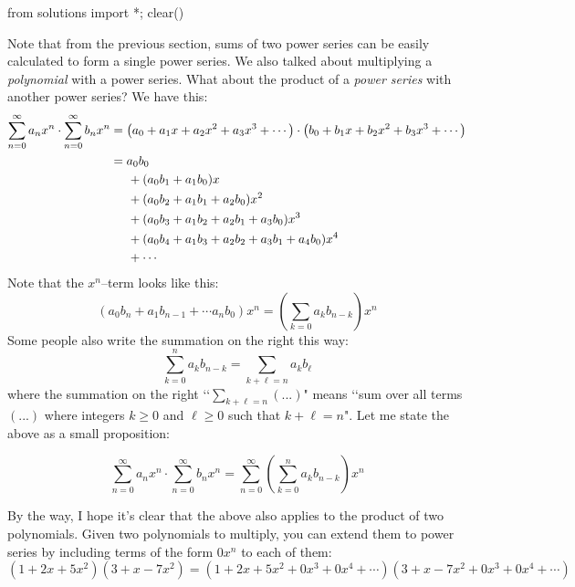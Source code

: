 \begin{python0}
from solutions import *; clear() 
\end{python0}

Note that from the previous section, sums of two power series
can be easily calculated to form a single power series.
We also talked about multiplying a \textit{polynomial} with a power series.
What about the product of a \textit{power series} with another power series?
We have this:
\begin{align*}
  \sum_{n=0}^\infty a_n x^n \cdot \sum_{n=0}^\infty b_n x^n
  &= \left(a_0 + a_1x + a_2x^2 + a_3x^3 + \cdots \right) \cdot
  \left(b_0 + b_1x + b_2x^2 + b_3x^3 + \cdots \right)
  \\
  &= a_0 b_0 \\
  &\hskip 0.5cm + (a_0 b_1 + a_1 b_0) x \\ 
  &\hskip 0.5cm + (a_0 b_2 + a_1 b_1 + a_2 b_0) x^2 \\ 
  &\hskip 0.5cm + (a_0 b_3 + a_1 b_2 + a_2 b_1 + a_3 b_0) x^3 \\
  &\hskip 0.5cm + (a_0 b_4 + a_1 b_3 + a_2 b_2 + a_3 b_1 + a_4 b_0) x^4 \\
  &\hskip 0.5cm + \cdots
\end{align*}
Note that the $x^n$--term looks like this:
\[
\left( a_0 b_n + a_1 b_{n-1} + \cdots a_n b_{0} \right) x^n = \left( \sum_{k=0}a_kb_{n-k} \right) x^n
\]
Some people also write the summation on the right this way:
\[
\sum_{k=0}^n a_kb_{n-k}
= \sum_{k + \ell = n} a_k b_\ell
\]
where the summation on the right
\lq\lq $\sum_{k + \ell = n} (...)$" means
\lq\lq sum over all terms $(...)$
where integers $k\geq 0$ and $\ell\geq 0$ such that 
$k + \ell = n$".
Let me state the above as a small proposition:

\begin{prop}\label{prop:product-of-power-series}
  \[
  \sum_{n=0}^\infty a_n x^n
  \cdot
  \sum_{n=0}^\infty b_n x^n
  =
  \sum_{n=0}^\infty \left( \sum_{k=0}^n a_k b_{n-k} \right) x^n
  \]
\end{prop}

By the way, I hope it's clear that the above also applies to
the product of two polynomials.
Given two polynomials to multiply, you can
extend them to power series by including terms of the form
$0x^n$ to each of them:
\[
(1 + 2x + 5x^2)(3 + x -7x^2)
=
(1 + 2x + 5x^2 + 0x^3 + 0x^4 + \cdots)
(3 + x -7x^2 + 0x^3 + 0x^4 + \cdots)
\]

